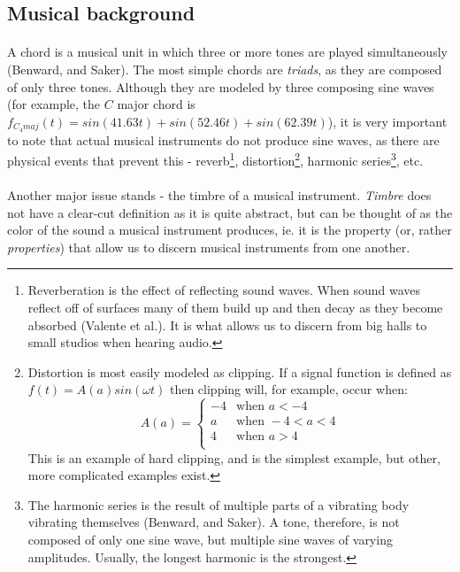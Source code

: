 \documentclass{article}
\begin{document}
\subsection{Musical background}

\paragraph*{}
A chord is a musical unit in which three or more tones are played 
simultaneously (Benward, and Saker). The most simple chords are 
\textit{triads}, as they are composed of only three tones. Although they are 
modeled by three composing sine waves (for example, the $C$ major chord is 
$f_{C_4maj} (t) = sin(41.63t) + sin(52.46t) + sin(62.39t)$), it is very 
important to note that actual musical instruments do not produce sine waves, 
as there are physical events that prevent this - reverb\footnote{Reverberation 
is the effect of reflecting sound waves. When sound waves reflect off of 
surfaces many of them build up and then decay as they become absorbed (Valente 
et al.). It is what allows us to discern from big halls to small studios when 
hearing audio.}, distortion\footnote{Distortion is most easily modeled as 
clipping. If a signal function is defined as $f(t) = A(a) sin(\omega t)$ then 
clipping will, for example, occur when:
$$A(a) = 
\begin{cases}
	-4	& \text{when }a < -4 \\
	a	& \text{when }-4 < a < 4 \\
	4	& \text{when }a > 4 \\
\end{cases}
$$
This is an example of hard clipping, and is the simplest example, but other, 
more complicated examples exist.}, harmonic series\footnote{The harmonic 
series is the result of multiple parts of a vibrating body vibrating 
themselves (Benward, and Saker). A tone, therefore, is not composed of only 
one sine wave, but multiple sine waves of varying amplitudes. Usually, the 
longest harmonic is the strongest.}, etc.

\paragraph*{}
Another major issue stands - the timbre of a musical instrument. 
\textit{Timbre} does not have a clear-cut definition as it is quite abstract, 
but can be thought of as the color of the sound a musical instrument produces, 
ie. it is the property (or, rather \textit{properties}) that allow us to 
discern musical instruments from one another.
\end{document}
